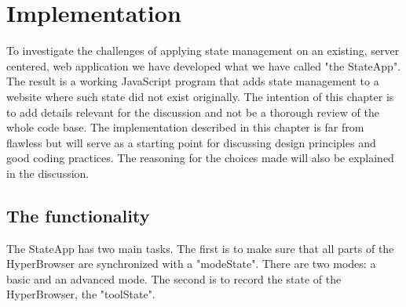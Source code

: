 \documentclass[english]{ifimaster}
\begin{document}
\chapter{Implementation}
To investigate the challenges of applying state management on an existing, server centered, web application we have developed what we have called "the StateApp". The result is a working JavaScript program that adds state management to a website where such state did not exist originally. The intention of this chapter is to add details relevant for the discussion and not be a thorough review of the whole code base. The implementation described in this chapter is far from flawless but will serve as a starting point for discussing design principles and good coding practices. The reasoning for the choices made will also be explained in the discussion.


\section{The functionality}
The StateApp has two main tasks. The first is to make sure that all parts of the HyperBrowser are synchronized with a "modeState". There are two modes: a basic and an advanced mode. The second is to record the state of the HyperBrowser, the "toolState".
\end{document}
